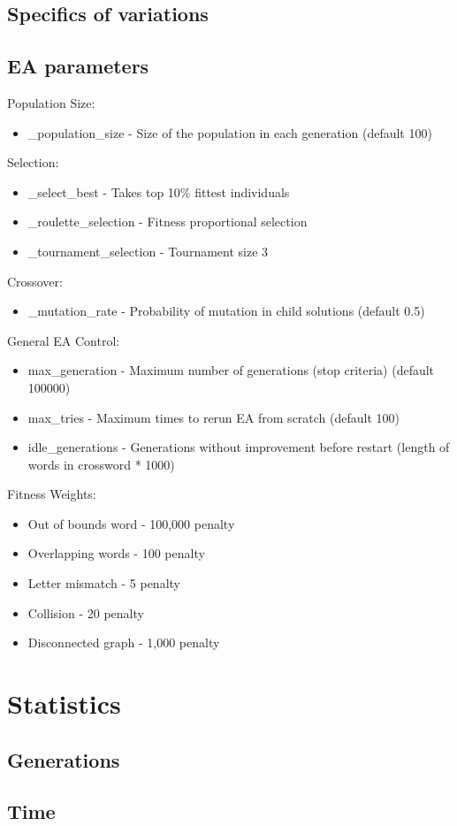 \documentclass{article}
\begin{document}
\subsection*{Specifics of variations}

\subsection*{EA parameters}
Population Size:
\begin{itemize}
		\item \_population\_size - Size of the population in each generation (default 100)
\end{itemize}

Selection:
\begin{itemize}
		\item \_select\_best - Takes top 10\% fittest individuals
		\item \_roulette\_selection - Fitness proportional selection
		\item \_tournament\_selection - Tournament size 3
\end{itemize}

Crossover:
\begin{itemize}
		\item \_mutation\_rate - Probability of mutation in child solutions (default 0.5)
\end{itemize}

General EA Control:
\begin{itemize}
		\item max\_generation - Maximum number of generations (stop criteria) (default 100000)
		\item max\_tries - Maximum times to rerun EA from scratch (default 100)
		\item idle\_generations - Generations without improvement before restart (length of words in crossword * 1000)
\end{itemize}

Fitness Weights:
\begin{itemize}
		\item Out of bounds word - 100,000 penalty
		\item Overlapping words - 100 penalty
		\item Letter mismatch - 5 penalty
		\item Collision - 20 penalty
		\item Disconnected graph - 1,000 penalty
\end{itemize}

\section*{Statistics}

\subsection*{Generations}

\subsection*{Time}
\end{document}

